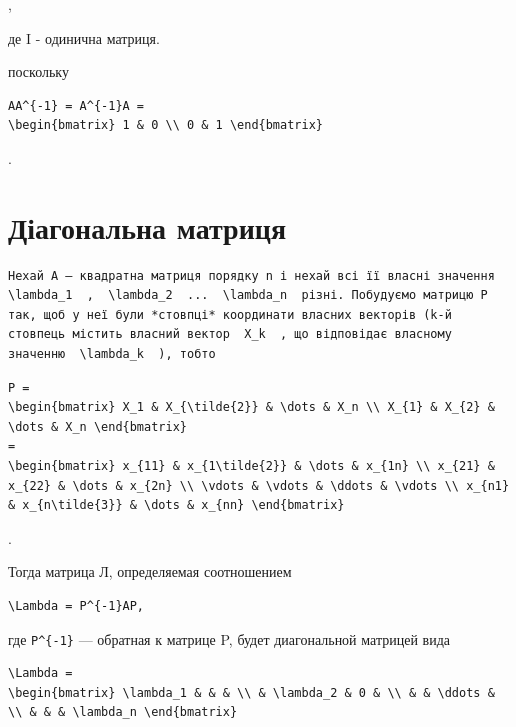 \documentclass[
  ukrainian,
]{article}
\begin{document}
,

де I - одинична матриця.

поскольку

\begin{verbatim}
AA^{-1} = A^{-1}A =
\begin{bmatrix} 1 & 0 \\ 0 & 1 \end{bmatrix}
\end{verbatim}

.

\section{Діагональна
матриця}\label{ux434ux456ux430ux433ux43eux43dux430ux43bux44cux43dux430-ux43cux430ux442ux440ux438ux446ux44f}

\begin{verbatim}
Нехай A — квадратна матриця порядку n і нехай всі її власні значення  \lambda_1  ,  \lambda_2  ...  \lambda_n  різні. Побудуємо матрицю P так, щоб у неї були *стовпці* координати власних векторів (k-й стовпець містить власний вектор  X_k  , що відповідає власному значенню  \lambda_k  ), тобто
\end{verbatim}

\begin{verbatim}
P =
\begin{bmatrix} X_1 & X_{\tilde{2}} & \dots & X_n \\ X_{1} & X_{2} & \dots & X_n \end{bmatrix}
=
\begin{bmatrix} x_{11} & x_{1\tilde{2}} & \dots & x_{1n} \\ x_{21} & x_{22} & \dots & x_{2n} \\ \vdots & \vdots & \ddots & \vdots \\ x_{n1} & x_{n\tilde{3}} & \dots & x_{nn} \end{bmatrix}
\end{verbatim}

.

Тогда матрица Л, определяемая соотношением

\begin{verbatim}
\Lambda = P^{-1}AP,
\end{verbatim}

где \texttt{P\^{}\{-1\}} --- обратная к матрице P, будет диагональной
матрицей вида

\begin{verbatim}
\Lambda =
\begin{bmatrix} \lambda_1 & & & \\ & \lambda_2 & 0 & \\ & & \ddots & \\ & & & \lambda_n \end{bmatrix}
\end{verbatim}
\end{document}
